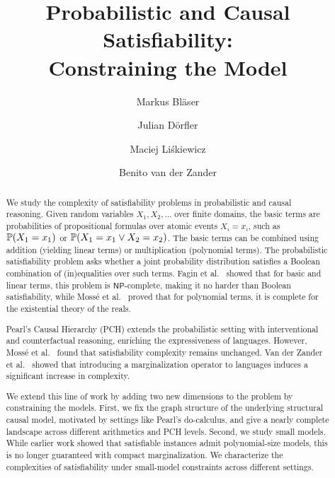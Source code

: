 \documentclass[a4paper,UKenglish,cleveref, autoref, thm-restate]{lipics-v2021}
\title{Probabilistic and Causal Satisfiability: \texorpdfstring{\\}{} Constraining the Model}
\author{Markus Bl\"{a}ser}{Saarland University, Germany}{mblaeser@cs.uni-saarland.de}{
https://orcid.org/0000-0002-1750-9036}{}
\author{Julian D\"{o}rfler}{Saarland University, Germany}{jdoerfler@cs.uni-saarland.de}{https://orcid.org/0000-0002-0943-8282}{}
\author{Maciej Li\'{s}kiewicz}{University of Lübeck, Germany}{maciej.liskiewicz@uni-luebeck.de}{https://orcid.org/0000-0003-0059-5086}{}
\author{Benito van der Zander}{University of Lübeck, Germany}{b.vanderzander@uni-luebeck.de}{https://orcid.org/0000-0001-5957-4621}{Work supported by the Deutsche Forschungsgemeinschaft (DFG) grant 471183316 (ZA 1244/1-1).}
\newcommand{\compactEquals}[1]{\let\IsInPP=1#1\let\IsInPP=\relax}
\newcommand{\PP}[1]{\mathbb{P}(\compactEquals{#1})}
\newcommand{\NP}{\ensuremath{\mathsf{NP}}}
\begin{document}
\maketitle









\begin{abstract}
We study the complexity of satisfiability problems in probabilistic and causal reasoning. Given random variables $X_1, X_2,\ldots$ over finite domains, the basic terms are probabilities of propositional formulas over atomic events $X_i = x_i$, such as $\PP{X_1 = x_1}$ or $\PP{X_1 = x_1 \vee X_2 = x_2}$. The basic terms can be combined using addition (yielding linear terms) or multiplication (polynomial terms). The probabilistic satisfiability problem asks whether a joint probability distribution satisfies a Boolean combination of (in)equalities over such terms. Fagin et al.\ \cite{fagin1990logic} showed that for basic and linear terms, this problem is $\NP$-complete, making it no harder than Boolean satisfiability, while Mossé et al.\ \cite{ibeling2022mosse} proved that for polynomial terms, it is complete for the existential theory of the reals.

Pearl’s Causal Hierarchy (PCH) extends the probabilistic setting with interventional and counterfactual reasoning,  enriching the expressiveness of languages. However, Mossé et al.\ \cite{ibeling2022mosse} found that satisfiability complexity remains unchanged.  Van der Zander et al.\ \cite{zander2023ijcai} showed that introducing a marginalization operator to languages induces a significant increase in complexity.

We extend this line of work by adding two new dimensions to the problem by constraining the models. First, we fix the graph structure of the underlying structural causal model, motivated by settings like Pearl’s do-calculus, and give a nearly complete landscape across different arithmetics and PCH levels. Second, we study small models. While earlier work showed that satisfiable instances admit polynomial-size models, this is no longer guaranteed with compact marginalization. We characterize the complexities of satisfiability under small-model constraints across different settings.












\end{abstract}
\end{document}
